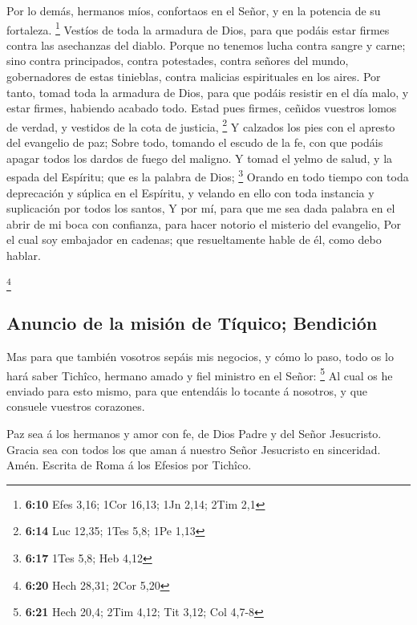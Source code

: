 Por lo demás, hermanos míos, confortaos en el Señor, y
en la potencia de su fortaleza. \footnote{\textbf{6:10} Efes 3,16; 1Cor
  16,13; 1Jn 2,14; 2Tim 2,1}  Vestíos de toda la armadura
de Dios, para que podáis estar firmes contra las asechanzas del diablo.
 Porque no tenemos lucha contra sangre y carne; sino
contra principados, contra potestades, contra señores del mundo,
gobernadores de estas tinieblas, contra malicias espirituales en los
aires.  Por tanto, tomad toda la armadura de Dios, para
que podáis resistir en el día malo, y estar firmes, habiendo acabado
todo.  Estad pues firmes, ceñidos vuestros lomos de
verdad, y vestidos de la cota de justicia, \footnote{\textbf{6:14} Luc
  12,35; 1Tes 5,8; 1Pe 1,13}  Y calzados los pies con el
apresto del evangelio de paz;  Sobre todo, tomando el
escudo de la fe, con que podáis apagar todos los dardos de fuego del
maligno.  Y tomad el yelmo de salud, y la espada del
Espíritu; que es la palabra de Dios; \footnote{\textbf{6:17} 1Tes 5,8;
  Heb 4,12}  Orando en todo tiempo con toda deprecación y
súplica en el Espíritu, y velando en ello con toda instancia y
suplicación por todos los santos,  Y por mí, para que me
sea dada palabra en el abrir de mi boca con confianza, para hacer
notorio el misterio del evangelio,  Por el cual soy
embajador en cadenas; que resueltamente hable de él, como debo hablar.

\footnote{\textbf{6:20} Hech 28,31; 2Cor 5,20}

\hypertarget{anuncio-de-la-misiuxf3n-de-tuxedquico-bendiciuxf3n}{%
\subsection{Anuncio de la misión de Tíquico;
Bendición}\label{anuncio-de-la-misiuxf3n-de-tuxedquico-bendiciuxf3n}}

 Mas para que también vosotros sepáis mis negocios, y
cómo lo paso, todo os lo hará saber Tichîco, hermano amado y fiel
ministro en el Señor: \footnote{\textbf{6:21} Hech 20,4; 2Tim 4,12; Tit
  3,12; Col 4,7-8}  Al cual os he enviado para esto
mismo, para que entendáis lo tocante á nosotros, y que consuele vuestros
corazones.

 Paz sea á los hermanos y amor con fe, de Dios Padre y
del Señor Jesucristo.  Gracia sea con todos los que aman
á nuestro Señor Jesucristo en sinceridad. Amén. Escrita de Roma á los
Efesios por Tichîco.
